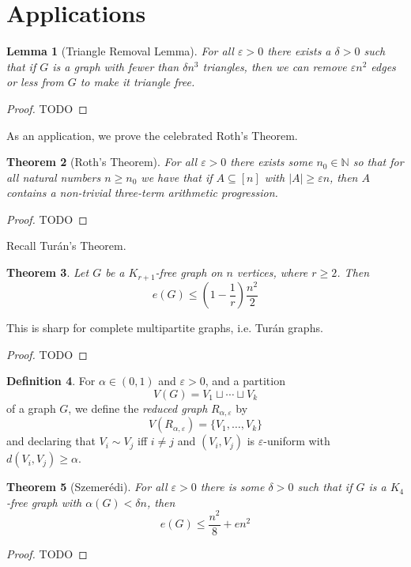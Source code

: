 \documentclass{report}
\theoremstyle{definition}
\theoremstyle{plain}
\newtheorem{thm}{Theorem}
\newtheorem{lem}[thm]{Lemma}
\theoremstyle{definition}
\newtheorem{defn}[thm]{Definition}
\begin{document}
 	\section{Applications}
 	\begin{lem}[Triangle Removal Lemma]
 		For all $\varepsilon > 0$ there exists a $\delta >0$ such that if $G$ is a graph with fewer than $\delta n^3$ triangles, then we can remove $\varepsilon n^2$ edges or less from $G$ to make it triangle free.
 	\end{lem}
 	\begin{proof}
 		{\color{red} TODO}
 	\end{proof}
 	As an application, we prove the celebrated Roth's Theorem.
 	\begin{thm}[Roth's Theorem]
 		For all $\varepsilon > 0$ there exists some $n_0\in\mathbb{N}$ so that for all natural numbers $n \geq n_0$ we have that if $A\subseteq [n]$ with $|A| \geq \varepsilon n$, then $A$ contains a non-trivial three-term arithmetic progression.
 	\end{thm}
 	\begin{proof}
 		{\color{red} TODO}
 	\end{proof}
 	Recall Turán's Theorem.
 	\begin{thm}
 		Let $G$ be a $K_{r+1}$-free graph on $n$ vertices, where $r\geq 2$. Then
 		\[
 			e(G) \leq \left(1-\frac{1}{r}\right)\frac{n^2}{2}
 		\]
 	\end{thm}
 	This is sharp for complete multipartite graphs, i.e. Turán graphs.
 	\begin{proof}
 		{\color{red} TODO}
 	\end{proof}
 	\begin{defn}
 		For $\alpha\in(0,1)$ and $\varepsilon > 0$, and a partition 
 		\[
 		V(G) = V_1 \sqcup \cdots \sqcup V_k
 		\]
 		of a graph $G$, we define the \emph{reduced graph} $R_{\alpha,\varepsilon}$ by
 		\[
 		V(R_{\alpha,\varepsilon}) = \{V_1,\ldots, V_k\}
 		\]
 		and declaring that $V_i \sim V_j$ iff $i\neq j$ and $(V_i,V_j)$ is $\varepsilon$-uniform with $d(V_i, V_j) \geq \alpha$.
 	\end{defn}
 	\begin{thm}[Szemerédi]
 		For all $\varepsilon > 0$ there is some $\delta >0$  such that if $G$ is a $K_4$-free graph  with $\alpha(G) < \delta n$, then 
 		\[
 			e(G) \leq \frac{n^2}{8} +en^2
 		\]
 	\end{thm}
 	\begin{proof}
 		{\color{red} TODO}
 	\end{proof}
\end{document}
